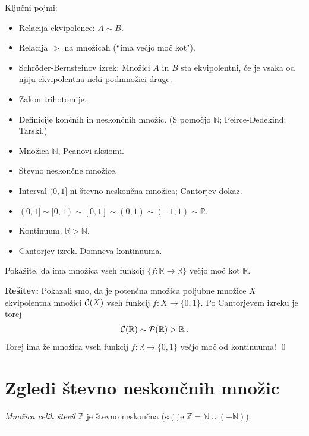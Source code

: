 \documentclass[11pt,paper=b5,footinclude,headinclude]{scrbook} %
\newtheorem{ex}{Vaja\hypertarget{sol:\theex}}[chapter]
\begin{document}
Ključni pojmi:
\begin{itemize}
\item Relacija ekvipolence: $A\sim B$.
\item Relacija $>$ na množicah (``ima večjo moč kot").
\item Schröder-Bernsteinov izrek: Množici $A$ in $B$ sta ekvipolentni, če je vsaka od
njiju ekvipolentna neki podmnožici druge.
\item Zakon trihotomije.
\item Definicije končnih in neskončnih množic. (S pomočjo $\mathbb N$; Peirce-Dedekind; Tarski.)
\item Množica $\mathbb N$, Peanovi aksiomi.
\item Števno neskončne množice.
\item Interval $(0,1]$ ni števno neskončna množica; Cantorjev dokaz.
\item $(0,1]\sim [0,1)\sim [0,1]\sim (0,1)\sim (-1,1)\sim \mathbb{R}$.
\item Kontinuum. $\mathbb{R}>\mathbb{N}$.
\item Cantorjev izrek. Domneva kontinuuma.
\end{itemize}

\begin{ex}
Pokažite, da ima množica vseh funkcij
$\{f:\mathbb{R}\to \mathbb{R}\}$ večjo moč kot $\mathbb{R}$.
\end{ex}


\bigskip
\textbf{Rešitev:} Pokazali smo, da je potenčna množica poljubne množice $X$
ekvipolentna množici ${\cal C}(X)$ vseh funkcij $f:X\to \{0,1\}$.
Po Cantorjevem izreku je torej
$${\cal C}(\mathbb{R})\sim {\cal P}(\mathbb{R})>\mathbb{R}\,.$$
Torej ima že množica vseh funkcij $f:\mathbb{R}\to \{0,1\}$ večjo moč od kontinuuma!
\qed


\section{Zgledi števno neskončnih množic}

\bigskip
{\em Množica celih števil} $\mathbb{Z}$ je števno neskončna (saj je $\mathbb{Z} = \mathbb{N}\cup (-\mathbb{N})$).

\bigskip
\hrule
\bigskip
\end{document}
